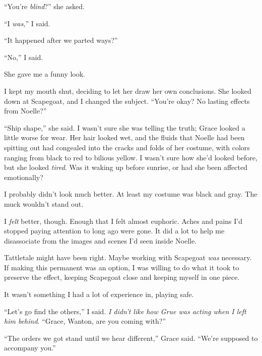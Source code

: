 ``You're \emph{blind}?'' she asked.



``I \emph{was},'' I said.



``It happened after we parted ways?''



``No,'' I said.



She gave me a funny look.



I kept my mouth shut, deciding to let her draw her own conclusions.  She looked down at Scapegoat, and I changed the subject.  ``You're okay?  No lasting effects from Noelle?''



``Ship shape,'' she said.  I wasn't sure she was telling the truth; Grace looked a little worse for wear.  Her hair looked wet, and the fluids that Noelle had been spitting out had congealed into the cracks and folds of her costume, with colors ranging from black to red to bilious yellow.  I wasn't sure how she'd looked before, but she looked \emph{tired}.  Was it waking up before sunrise, or had she been affected emotionally?



I probably didn't look much better.  At least my costume was black and gray.  The muck wouldn't stand out.



I \emph{felt} better, though.  Enough that I felt almost euphoric.  Aches and pains I'd stopped paying attention to long ago were gone.  It did a lot to help me disassociate from the images and scenes I'd seen inside Noelle.



Tattletale might have been right.  Maybe working with Scapegoat \emph{was} necessary.  If making this permanent was an option, I was willing to do what it took to preserve the effect, keeping Scapegoat close and keeping myself in one piece.



It wasn't something I had a lot of experience in, playing safe.



``Let's go find the others,'' I said.  \emph{I didn't like how Grue was acting when I left him behind}.  ``Grace, Wanton, are you coming with?''



``The orders we got stand until we hear different,'' Grace said.  ``We're supposed to accompany you.''



